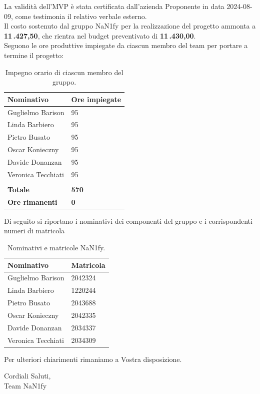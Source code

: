 \documentclass[8pt]{article}
\begin{document}
La validità dell'MVP è stata certificata dall'azienda Proponente in data 2024-08-09, come testimonia il relativo verbale esterno. \\
Il costo sostenuto dal gruppo NaN1fy per la realizzazione del progetto ammonta a \textbf{11\,.427,50\;\texteuro}, che rientra nel budget preventivato di \textbf{11\,.430,00\;\texteuro}. \\ Seguono le ore produttive impiegate da ciascun membro del team per portare a termine il progetto:
\begin{table}[H]
	\centering
	\begin{tabular}{p{3cm} p{3cm}}
		\toprule
		\textbf{Nominativo} & \textbf{Ore impiegate} \\
		\midrule
		Guglielmo Barison & 95 \\
		Linda Barbiero &  95 \\
		Pietro Busato & 95 \\
		Oscar Konieczny & 95 \\
		Davide Donanzan & 95 \\
		Veronica Tecchiati & 95 \\\\
            \textbf{Totale} & \textbf{570} \\
            \textbf{Ore rimanenti} & \textbf{0} \\
		\bottomrule
	\end{tabular}
	\caption{Impegno orario di ciascun membro del gruppo.}
	\label{table:Impegno orario di ciascun membro del gruppo}
\end{table}
Di seguito si riportano i nominativi dei componenti del gruppo e i corrispondenti numeri di matricola\\
\begin{table}[H]
	\centering
	\begin{tabular}{p{3cm} p{3cm}}
		\toprule
		\textbf{Nominativo} & \textbf{Matricola} \\
		\midrule
		Guglielmo Barison & 2042324 \\
		Linda Barbiero &  1220244 \\
		Pietro Busato & 2043688 \\
		Oscar Konieczny & 2042335 \\
		Davide Donanzan & 2034337 \\
		Veronica Tecchiati & 2034309 \\
		\bottomrule
	\end{tabular}
	\caption{Nominativi e matricole NaN1fy.}
	\label{table:Nominativi e matricole NaN1fy}
\end{table}
Per ulteriori chiarimenti rimaniamo a Vostra disposizione.
\vspace{1em}
\begin{flushleft}
	Cordiali Saluti,\\
	Team NaN1fy
\end{flushleft}
\clearpage
\newpage
\justifying
\end{document}
